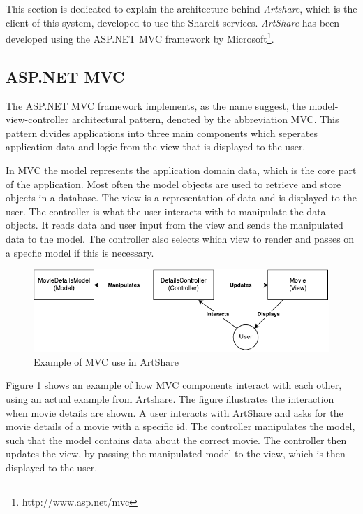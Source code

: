 \documentclass[../report.tex]{subfiles}
\begin{document}
\graphicspath{{img/}{../img/}}

This section is dedicated to explain the architecture behind \textit{Artshare}, which is the client of this system, developed to use the ShareIt services. \textit{ArtShare} has been developed using the ASP.NET MVC framework by Microsoft\footnote{http://www.asp.net/mvc}. 


\subsection{ASP.NET MVC}

The ASP.NET MVC framework implements, as the name suggest, the model-view-controller architectural pattern, denoted by the abbreviation MVC. This pattern divides applications into three main components which seperates application data and logic from the view that is displayed to the user. 

In MVC the model represents the application domain data, which is the core part of the application. Most often the model objects are used to retrieve and store objects in a database. The view is a representation of data and is displayed to the user. The controller is what the user interacts with to manipulate the data objects. It reads data and user input from the view and sends the manipulated data to the model. The controller also selects which view to render and passes on a specfic model if this is necessary.

\begin{figure}[H]
\includegraphics[width=\linewidth]{mvc.pdf}
\caption{Example of MVC use in ArtShare}
\label{fig:mvc}
\end{figure}

Figure \ref{fig:mvc} shows an example of how MVC components interact with each other, using an actual example from Artshare. The figure illustrates the interaction when movie details are shown. A user interacts with ArtShare and asks for the movie details of a movie with a specific id. The controller manipulates the model, such that the model contains data about the correct movie. The controller then updates the view, by passing the manipulated model to the view, which is then displayed to the user.
\end{document}
